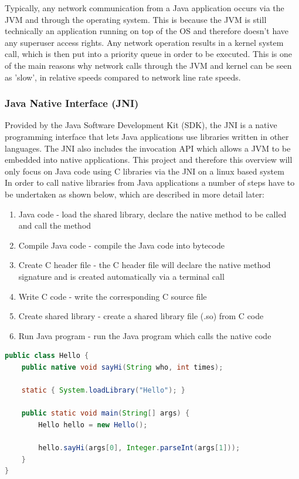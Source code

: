 \documentclass[a4paper, titlepage]{article}
\begin{document}
Typically, any network communication from a Java application occurs via the JVM and through the operating system. This is because the JVM is still technically an application running on top of the OS and therefore doesn't have any superuser access rights. Any network operation results in a kernel system call, which is then put into a priority queue in order to be executed. This is one of the main reasons why network calls through the JVM and kernel can be seen as 'slow', in relative speeds compared to network line rate speeds.

\subsubsection{Java Native Interface (JNI)}
Provided by the Java Software Development Kit (SDK), the JNI is a native programming interface that lets Java applications use libraries written in other languages. The JNI also includes the invocation API which allows a JVM to be embedded into native applications. This project and therefore this overview will only focus on Java code using C libraries via the JNI on a linux based system\\
\newline
In order to call native libraries from Java applications a number of steps have to be undertaken as shown below, which are described in more detail later:
\begin{enumerate}
	\item Java code - load the shared library, declare the native method to be called and call the method
	\item Compile Java code - compile the Java code into bytecode
	\item Create C header file - the C header file will declare the native method signature and is created automatically via a terminal call
	\item Write C code - write the corresponding C source file
	\item Create shared library - create a shared library file (.so) from C code
	\item Run Java program - run the Java program which calls the native code
\end{enumerate}

\begin{lstlisting}[language=Java, caption={Basic Java class showing native method declaration and calling with shared library loading}, label=lst:java]
public class Hello {
    public native void sayHi(String who, int times);

    static { System.loadLibrary("Hello"); }

    public static void main(String[] args) {
        Hello hello = new Hello();
        
        hello.sayHi(args[0], Integer.parseInt(args[1]));
    }
}
\end{lstlisting}
\end{document}
